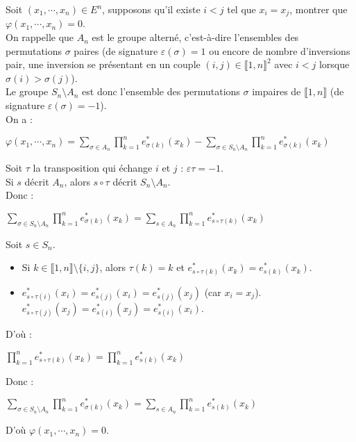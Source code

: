 \documentclass[12pt,a4paper]{report}
\begin{document}
\begin{demo}{}
\begin{itemize}
	Soit $(x_1,\cdots,x_n) \in E^n$, supposons qu'il existe $i<j$ tel que $x_i=x_j$, montrer que $\varphi(x_1,\cdots,x_n) = 0$. \\
	
	On rappelle que $A_n$ est le groupe alterné, c'est-à-dire l'ensembles des permutations $\sigma$ paires (\ie de signature $\varepsilon(\sigma) = 1$ ou encore de nombre d'inversions pair, une inversion se présentant en un couple $(i,j) \in \llbracket 1,n \rrbracket^2$ avec $i<j$ lorsque $\sigma(i)>\sigma(j)$). \\
	Le groupe $S_n \setminus A_n$ est donc l'ensemble des permutations $\sigma$ impaires de $\llbracket 1,n \rrbracket$ (\ie de signature $\varepsilon(\sigma) = -1$). \\
	
	On a :
	\begin{center}
	$\varphi(x_1,\cdots,x_n) = \displaystyle{\sum_{\sigma \in A_n} \prod_{k=1}^n e^*_{\sigma(k)}(x_k) - \sum_{\sigma \in S_n \setminus A_n} \prod_{k=1}^n e^*_{\sigma(k)}(x_k)}$
	\end{center}
	
	Soit $\tau$ la transposition qui échange $i$ et $j$ : $\varepsilon{\tau} = -1$. \\
	Si $s$ décrit $A_n$, alors $s \circ \tau$ décrit $S_n \setminus A_n$. \\
	Donc :
	\begin{center}
	$\displaystyle{\sum_{\sigma \in S_n \setminus A_n} \prod_{k=1}^n e^*_{\sigma(k)}(x_k) = \sum_{s \in A_n} \prod_{k=1}^n e^*_{s \circ \tau(k)}(x_k)}$
	\end{center}
	
	Soit $s \in S_n$.
	\begin{itemize}
		\item Si $k \in \llbracket 1,n \rrbracket \setminus \{i,j\}$, alors $\tau(k) = k$ et $e^*_{s \circ \tau(k)}(x_k) = e^*_{s(k)}(x_k)$.
		\item $e^*_{s \circ \tau(i)}(x_i) = e^*_{s(j)}(x_i) = e^*_{s(j)}(x_j)$ (car $x_i = x_j$). \\
		$e^*_{s \circ \tau(j)}(x_j) = e^*_{s(i)}(x_j) = e^*_{s(i)}(x_i)$.
	\end{itemize}
	D'où :
	\begin{center}
	$\displaystyle{\prod_{k=1}^n e^*_{s \circ \tau(k)} (x_k)} = \displaystyle{\prod_{k=1}^n e^*_{s(k)}(x_k)}$
	\end{center}
	Donc : 
	\begin{center}
	$\displaystyle{\sum_{\sigma \in S_n \setminus A_n} \prod_{k=1}^n e^*_{\sigma(k)}(x_k) = \sum_{s \in A_n} \prod_{k=1}^n e^*_{s(k)}(x_k)}$
	\end{center}
	D'où $\varphi(x_1,\cdots,x_n) = 0$.
\end{itemize}
\end{demo}
\end{document}
